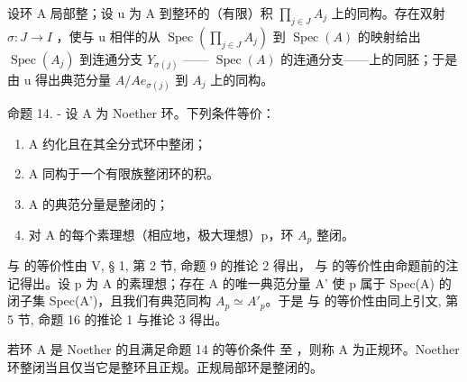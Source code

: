 设环 A 局部整；设 u 为 A 到整环的（有限）积 \(\prod_{j\in J}A_{j}\) 上的同构。存在双射 \(\sigma:J\to I\) ，使与 u 相伴的从 \(\operatorname{Spec}(\prod_{j\in J}A_{j})\) 到 \(\operatorname{Spec}(A)\) 的映射给出 \(\operatorname{Spec}(A_{j})\) 到连通分支 \(Y_{\sigma(j)}\) —— \(\operatorname{Spec}(A)\) 的连通分支——上的同胚；于是由 u 得出典范分量 \(A/Ae_{\sigma(j)}\) 到 \(A_{j}\) 上的同构。

命题 14. - 设 A 为 Noether 环。下列条件等价：

\begin{enumerate}
\def\labelenumi{(\roman{enumi})}
\item
  A 约化且在其全分式环中整闭；
\item
  A 同构于一个有限族整闭环的积。
\item
  A 的典范分量是整闭的；
\item
  对 A 的每个素理想（相应地，极大理想）p，环 \(A_{p}\) 整闭。
\end{enumerate}

 与 的等价性由 V, § 1, 第 2 节, 命题 9 的推论 2 得出， 与 的等价性由命题前的注记得出。设 p 为 A 的素理想；存在 A 的唯一典范分量 A' 使 p 属于 Spec(A) 的闭子集 Spec(A')，且我们有典范同构 \(A_{p} \simeq A'_{p}\)。于是 与 的等价性由同上引文, 第 5 节, 命题 16 的推论 1 与推论 3 得出。

若环 A 是 Noether 的且满足命题 14 的等价条件 至 ，则称 A 为正规环。Noether 环整闭当且仅当它是整环且正规。正规局部环是整闭的。

